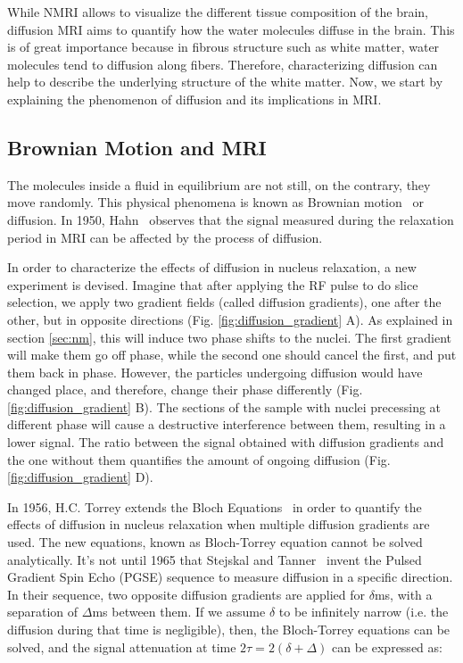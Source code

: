 While NMRI allows to visualize the different tissue composition of the brain,
diffusion MRI aims to quantify how the water molecules diffuse in the brain.
This is of great importance because in fibrous structure such as white matter,
water molecules tend to diffusion along fibers. Therefore, characterizing diffusion
can help to describe the underlying structure of the white matter. Now, we
start by explaining the phenomenon of diffusion and its implications in MRI.

\subsection{Brownian Motion and MRI}
The molecules inside a fluid in equilibrium are not still, on the contrary, 
they move randomly. This physical phenomena is known as Brownian motion~\cite{Brown1828}
or diffusion. In 1950, Hahn~\cite{Hahn1950} observes that the signal measured
during the relaxation period in MRI can be affected by the process of diffusion.

In order to characterize the effects of diffusion in nucleus relaxation, a
new experiment is devised. Imagine that after applying the RF pulse to do
slice selection, we apply two gradient fields (called diffusion gradients), one
after the other, but in opposite directions (Fig. \ref{fig:diffusion_gradient} A).
As explained in section \ref{sec:nm}, this will induce two phase shifts to the nuclei.
The first gradient will make them go off phase, while the second one should
cancel the first, and put them back in phase. However, the particles undergoing
diffusion would have changed place, and therefore, change their phase differently
(Fig. \ref{fig:diffusion_gradient} B). The sections of the sample with nuclei
precessing at different phase will cause a destructive interference between them,
resulting in a lower signal. The ratio between the signal obtained with 
diffusion gradients and the one without them quantifies the amount of ongoing
diffusion (Fig. \ref{fig:diffusion_gradient} D).

In 1956, H.C. Torrey \cite{Torrey1956} extends the Bloch Equations~\cite{Bloch1946}
in order to quantify the effects of diffusion in nucleus relaxation when
multiple diffusion gradients are used. The new equations, known as Bloch-Torrey
equation cannot be solved analytically. It's not until 1965 that
Stejskal and Tanner~\cite{Stejskal1965} invent the Pulsed Gradient Spin
Echo (PGSE) sequence to measure diffusion in a specific direction. In their
sequence, two opposite diffusion gradients are applied for $\delta$ms, with a
separation of $\Delta$ms between them. If we assume $\delta$ to be infinitely
narrow (i.e. the diffusion during that time is negligible), then,
the Bloch-Torrey equations can be solved, and the signal attenuation at time
$2\tau = 2(\delta + \Delta)$  can be expressed as:

